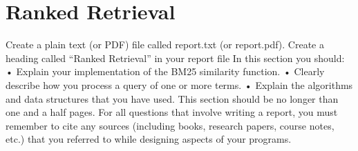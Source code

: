 
\section{Ranked Retrieval}

Create a plain text (or PDF) file called report.txt (or report.pdf). Create a heading called “Ranked Retrieval” in your report file In this section you should:
• Explain your implementation of the BM25 similarity function. 
• Clearly describe how you process a query of one or more terms. 
• Explain the algorithms and data structures that you have used.
This section should be no longer than one and a half pages.
For all questions that involve writing a report, you must remember to cite any sources (including books, research papers, course notes, etc.) that you referred to while designing aspects of your programs.